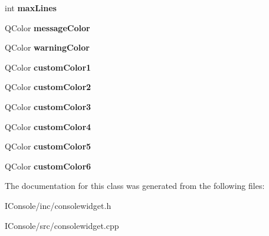 \begin{DoxyCompactItemize}
\item 
\hypertarget{class_console_widget_afef59d721756f56c09780682aa0e7fac}{int {\bfseries max\-Lines}}\label{class_console_widget_afef59d721756f56c09780682aa0e7fac}

\item 
\hypertarget{class_console_widget_a2c801d4bdb2605d0d4fcf2812b0f33fc}{Q\-Color {\bfseries message\-Color}}\label{class_console_widget_a2c801d4bdb2605d0d4fcf2812b0f33fc}

\item 
\hypertarget{class_console_widget_ac0fe2ed854169ca40a506eef06dd7627}{Q\-Color {\bfseries warning\-Color}}\label{class_console_widget_ac0fe2ed854169ca40a506eef06dd7627}

\item 
\hypertarget{class_console_widget_a2ced0beaf2345ea1a5a430dbecce8980}{Q\-Color {\bfseries custom\-Color1}}\label{class_console_widget_a2ced0beaf2345ea1a5a430dbecce8980}

\item 
\hypertarget{class_console_widget_a538953029512834275ace6ab1f9ff4f8}{Q\-Color {\bfseries custom\-Color2}}\label{class_console_widget_a538953029512834275ace6ab1f9ff4f8}

\item 
\hypertarget{class_console_widget_a3b0ddd26653c304ec53a0388a5b56ef7}{Q\-Color {\bfseries custom\-Color3}}\label{class_console_widget_a3b0ddd26653c304ec53a0388a5b56ef7}

\item 
\hypertarget{class_console_widget_aff88cf79de3c9d2f2679fe4729bd4e7b}{Q\-Color {\bfseries custom\-Color4}}\label{class_console_widget_aff88cf79de3c9d2f2679fe4729bd4e7b}

\item 
\hypertarget{class_console_widget_ae8282e6520cc5c909193c5f42bcba7f8}{Q\-Color {\bfseries custom\-Color5}}\label{class_console_widget_ae8282e6520cc5c909193c5f42bcba7f8}

\item 
\hypertarget{class_console_widget_a6f3957397a3eead2d5a7785342288239}{Q\-Color {\bfseries custom\-Color6}}\label{class_console_widget_a6f3957397a3eead2d5a7785342288239}

\end{DoxyCompactItemize}


The documentation for this class was generated from the following files\-:\begin{DoxyCompactItemize}
\item 
I\-Console/inc/consolewidget.\-h\item 
I\-Console/src/consolewidget.\-cpp\end{DoxyCompactItemize}
